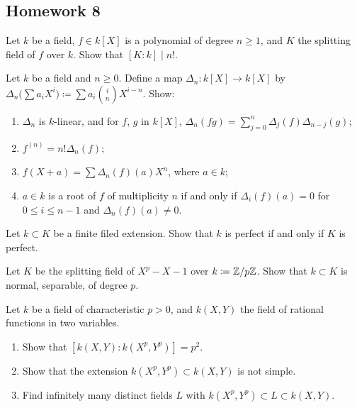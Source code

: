 \subsection{Homework 8}
\begin{problem}
  Let $k$ be a field, $f\in k[X]$ is a polynomial of degree $n\geq 1$,
  and $K$ the splitting field of $f$ over $k$. Show that
  $[K:k]\mid n!$.
\end{problem}
\begin{solution}
\end{solution}

\begin{problem}
  Let $k$ be a field and $n\geq 0$. Define a map
  $\Delta_n\colon k[X]\to k[X]$ by
  $\Delta_n\bigl(\sum a_iX^i\bigr)\coloneq\sum
  a_i\binom{i}{n}X^{i-n}$. Show:
\begin{enumerate}[label=(\alph*),noitemsep]
\item $\Delta_n$ is $k$-linear, and for $f$, $g$ in $k[X]$,
  $\Delta_n(fg)=\sum_{j=0}^n\Delta_j(f)\Delta_{n-j}(g)$;
\item $f^{(n)}=n!\Delta_n(f)$;
\item $f(X+a)=\sum\Delta_n(f)(a)X^n$, where $a\in k$;
\item $a\in k$ is a root of $f$ of multiplicity $n$ if and only if
  $\Delta_i(f)(a)=0$ for $0\leq i\leq n-1$ and $\Delta_n(f)(a)\neq 0$.
\end{enumerate}
\end{problem}
\begin{solution}
\end{solution}

\begin{problem}
  Let $k\subset K$ be a finite filed extension. Show that $k$ is
  perfect if and only if $K$ is perfect.
\end{problem}
\begin{solution}
\end{solution}

\begin{problem}
  Let $K$ be the splitting field of $X^p-X-1$ over
  $k\coloneq\mathbb{Z}/p\mathbb{Z}$. Show that $k\subset K$ is normal,
  separable, of degree $p$.
\end{problem}
\begin{solution}
\end{solution}

\begin{problem}
  Let $k$ be a field of characteristic $p>0$, and $k(X,Y)$ the field
  of rational functions in two variables.
\begin{enumerate}[label=(\alph*),noitemsep]
\item Show that $\left[k(X,Y):k(X^p,Y^p)\right]=p^2$.
\item Show that the extension $k(X^p,Y^p)\subset k(X,Y)$ is not
  simple.
\item Find infinitely many distinct fields $L$ with
  $k(X^p,Y^p)\subset L\subset k(X,Y)$.
\end{enumerate}
\end{problem}
\begin{solution}
\end{solution}

